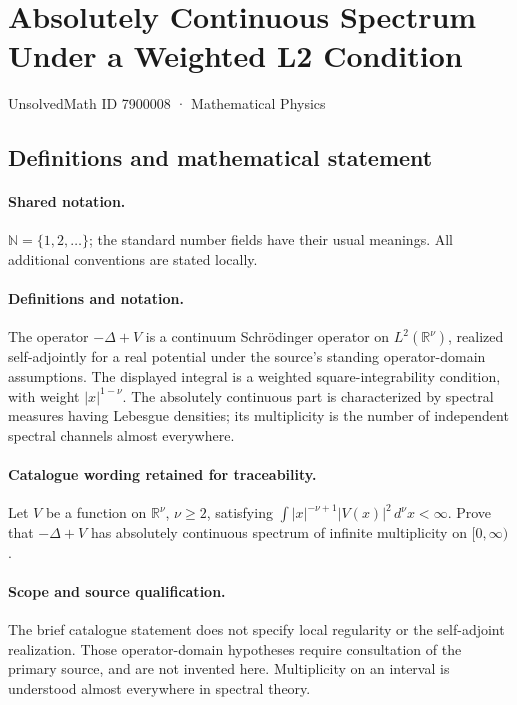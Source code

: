 \documentclass[11pt]{article}
\begin{document}
\setcounter{section}{7900007}
\section{Absolutely Continuous Spectrum Under a Weighted L2 Condition}\label{7900008}
{\small UnsolvedMath ID 7900008 · Mathematical Physics}
\subsection{Definitions and mathematical statement}

\paragraph{Shared notation.}$\mathbb N=\{1,2,\ldots\}$; the standard number fields have their usual meanings. All additional conventions are stated locally.


\paragraph{Definitions and notation.}The operator $-\Delta+V$ is a continuum Schrödinger operator on $L^2(\mathbb R^\nu)$, realized self-adjointly for a real potential under the source’s standing operator-domain assumptions. The displayed integral is a weighted square-integrability condition, with weight $|x|^{1-\nu}$. The absolutely continuous part is characterized by spectral measures having Lebesgue densities; its multiplicity is the number of independent spectral channels almost everywhere.

\paragraph{Catalogue wording retained for traceability.}
Let $V$ be a function on $\mathbb R^\nu$, $\nu\geq2$, satisfying $\int |x|^{-\nu+1}|V(x)|^2\,d^\nu x<\infty$. Prove that $-\Delta+V$ has absolutely continuous spectrum of infinite multiplicity on $[0,\infty)$.
\paragraph{Scope and source qualification.}The brief catalogue statement does not specify local regularity or the self-adjoint realization. Those operator-domain hypotheses require consultation of the primary source, and are not invented here. Multiplicity on an interval is understood almost everywhere in spectral theory.
\end{document}
